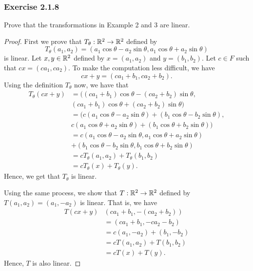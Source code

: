 \subsubsection{Exercise 2.1.8} Prove that the transformations in Example 2 and 3 are linear.
\begin{proof}
    First we prove that \( T_{\theta}: \mathbb{R}^{2} \to \mathbb{R}^{2} \) defined by 
    \[  T_{\theta}(a_{1}, a_{2}) = (a_{1}\cos \theta - a_{2} \sin \theta, a_{1} \cos \theta + a_{2} \sin \theta) \]
    is linear. Let \( x,y \in \mathbb{R}^{2}  \) defined by \( x = (a_{1}, a_{2}) \) and \( y = (b_{1}, b_{2}) \). Let \( c \in F  \) such that \( cx = (ca_{1}, ca_{2}) \). To make the computation less difficult, we have
    \[  cx + y = (ca_{1} + b_{1}, ca_{2} + b_{2}). \]
    Using the definition \( T_{\theta} \) now, we have that 
    \begin{align*}
        T_{\theta}(cx + y) &= ((ca_{1} + b_{1})\cos \theta - (ca_{2} + b_{2}) \sin \theta,  \\
                           &(ca_{1} + b_{1}) \cos \theta + (ca_{2} + b_{2}) \sin \theta ) \\
                           &= (c (a_{1}\cos \theta  - a_{2} \sin \theta) + (b_{1} \cos \theta - b_{2} \sin \theta ), \\
                           &c ( a_{1} \cos \theta + a_{2} \sin \theta ) + (b_{1} \cos \theta + b_{2} \sin \theta)           ) \\
                           &= c (a_{1} \cos \theta - a_{2} \sin \theta, a_{1} \cos \theta + a_{2} \sin \theta)  \\
                           &+ (b_{1} \cos \theta - b_{2} \sin \theta , b_{1} \cos \theta + b_{2} \sin \theta) \\
                           &= c T_{\theta}(a_{1}, a_{2}) + T_{\theta}(b_{1}, b_{2}) \\
                           &= c T_{\theta}(x) + T_{\theta}(y).
    \end{align*}
    Hence, we get that \( T_{\theta} \) is linear.

    Using the same process, we show that \( T: \mathbb{R}^{2} \to \mathbb{R}^{2}  \) defined by \( T(a_{1}, a_{2}) = (a_{1}, - a_{2})\) is linear. That is, we have
    \begin{align*}
        T(cx + y) & (ca_{1} + b_{1}, - (ca_{2} + b_{2})) \\
                  &= (ca_{1} + b_{1}, -ca_{2} - b_{2}) \\ 
                  &= c(a_{1}, -a_{2}) + (b_{1}, -b_{2}) \\
                  &= c T(a_{1}, a_{2}) + T(b_{1}, b_{2}) \\
                  &= cT(x) + T(y).
    \end{align*}
    Hence, \( T  \) is also linear.
\end{proof}

